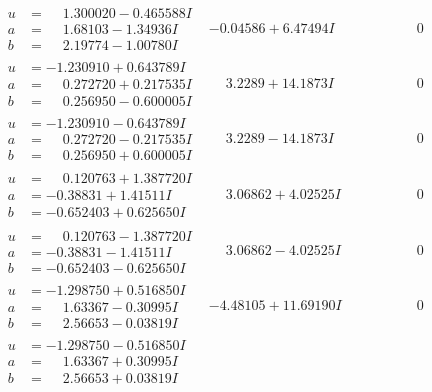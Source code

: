 \documentclass[1p]{elsarticle_modified}
\theoremstyle{definition}
\begin{document}
$$\begin{array}{c|c|c}
\begin{aligned}
u &= \phantom{-}1.300020 - 0.465588 I \\
a &= \phantom{-}1.68103 - 1.34936 I \\
b &= \phantom{-}2.19774 - 1.00780 I\end{aligned}
 & -0.04586 + 6.47494 I & \phantom{-0.000000 } 0 \\ \hline\begin{aligned}
u &= -1.230910 + 0.643789 I \\
a &= \phantom{-}0.272720 + 0.217535 I \\
b &= \phantom{-}0.256950 - 0.600005 I\end{aligned}
 & \phantom{-}3.2289 + 14.1873 I & \phantom{-0.000000 } 0 \\ \hline\begin{aligned}
u &= -1.230910 - 0.643789 I \\
a &= \phantom{-}0.272720 - 0.217535 I \\
b &= \phantom{-}0.256950 + 0.600005 I\end{aligned}
 & \phantom{-}3.2289 - 14.1873 I & \phantom{-0.000000 } 0 \\ \hline\begin{aligned}
u &= \phantom{-}0.120763 + 1.387720 I \\
a &= -0.38831 + 1.41511 I \\
b &= -0.652403 + 0.625650 I\end{aligned}
 & \phantom{-}3.06862 + 4.02525 I & \phantom{-0.000000 } 0 \\ \hline\begin{aligned}
u &= \phantom{-}0.120763 - 1.387720 I \\
a &= -0.38831 - 1.41511 I \\
b &= -0.652403 - 0.625650 I\end{aligned}
 & \phantom{-}3.06862 - 4.02525 I & \phantom{-0.000000 } 0 \\ \hline\begin{aligned}
u &= -1.298750 + 0.516850 I \\
a &= \phantom{-}1.63367 - 0.30995 I \\
b &= \phantom{-}2.56653 - 0.03819 I\end{aligned}
 & -4.48105 + 11.69190 I & \phantom{-0.000000 } 0 \\ \hline\begin{aligned}
u &= -1.298750 - 0.516850 I \\
a &= \phantom{-}1.63367 + 0.30995 I \\
b &= \phantom{-}2.56653 + 0.03819 I\end{aligned}

\end{array}$$
\end{document}

